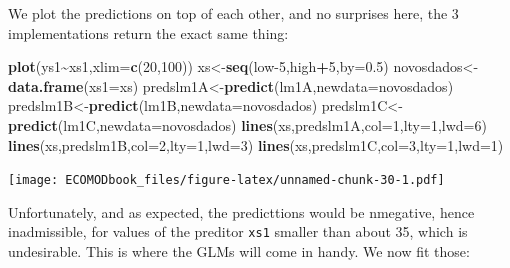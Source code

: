 \documentclass[
]{book}
\newenvironment{Shaded}{\begin{snugshade}}{\end{snugshade}}
\newcommand{\AttributeTok}[1]{\textcolor[rgb]{0.13,0.29,0.53}{#1}}
\newcommand{\DecValTok}[1]{\textcolor[rgb]{0.00,0.00,0.81}{#1}}
\newcommand{\FloatTok}[1]{\textcolor[rgb]{0.00,0.00,0.81}{#1}}
\newcommand{\FunctionTok}[1]{\textcolor[rgb]{0.13,0.29,0.53}{\textbf{#1}}}
\newcommand{\NormalTok}[1]{#1}
\newcommand{\OtherTok}[1]{\textcolor[rgb]{0.56,0.35,0.01}{#1}}
\newcommand{\SpecialCharTok}[1]{\textcolor[rgb]{0.81,0.36,0.00}{\textbf{#1}}}
\begin{document}
We plot the predictions on top of each other, and no surprises here, the 3 implementations return the exact same thing:

\begin{Shaded}
\begin{Highlighting}[]
\FunctionTok{plot}\NormalTok{(ys1}\SpecialCharTok{\textasciitilde{}}\NormalTok{xs1,}\AttributeTok{xlim=}\FunctionTok{c}\NormalTok{(}\DecValTok{20}\NormalTok{,}\DecValTok{100}\NormalTok{))}
\NormalTok{xs}\OtherTok{\textless{}{-}}\FunctionTok{seq}\NormalTok{(low}\DecValTok{{-}5}\NormalTok{,high}\SpecialCharTok{+}\DecValTok{5}\NormalTok{,}\AttributeTok{by=}\FloatTok{0.5}\NormalTok{)}
\NormalTok{novosdados}\OtherTok{\textless{}{-}}\FunctionTok{data.frame}\NormalTok{(}\AttributeTok{xs1=}\NormalTok{xs)}
\NormalTok{predslm1A}\OtherTok{\textless{}{-}}\FunctionTok{predict}\NormalTok{(lm1A,}\AttributeTok{newdata=}\NormalTok{novosdados)}
\NormalTok{predslm1B}\OtherTok{\textless{}{-}}\FunctionTok{predict}\NormalTok{(lm1B,}\AttributeTok{newdata=}\NormalTok{novosdados)}
\NormalTok{predslm1C}\OtherTok{\textless{}{-}}\FunctionTok{predict}\NormalTok{(lm1C,}\AttributeTok{newdata=}\NormalTok{novosdados)}
\FunctionTok{lines}\NormalTok{(xs,predslm1A,}\AttributeTok{col=}\DecValTok{1}\NormalTok{,}\AttributeTok{lty=}\DecValTok{1}\NormalTok{,}\AttributeTok{lwd=}\DecValTok{6}\NormalTok{)}
\FunctionTok{lines}\NormalTok{(xs,predslm1B,}\AttributeTok{col=}\DecValTok{2}\NormalTok{,}\AttributeTok{lty=}\DecValTok{1}\NormalTok{,}\AttributeTok{lwd=}\DecValTok{3}\NormalTok{)}
\FunctionTok{lines}\NormalTok{(xs,predslm1C,}\AttributeTok{col=}\DecValTok{3}\NormalTok{,}\AttributeTok{lty=}\DecValTok{1}\NormalTok{,}\AttributeTok{lwd=}\DecValTok{1}\NormalTok{)}
\end{Highlighting}
\end{Shaded}

\texttt{[image: ECOMODbook\_files/figure-latex/unnamed-chunk-30-1.pdf]}

Unfortunately, and as expected, the predicttions would be nmegative, hence inadmissible, for values of the preditor \texttt{xs1} smaller than about 35, which is undesirable. This is where the GLMs will come in handy. We now fit those:
\end{document}
